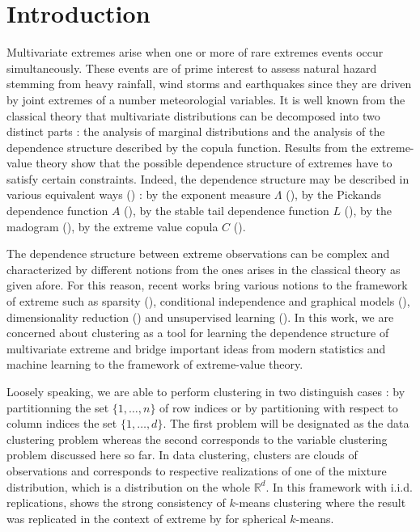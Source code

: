 \documentclass[11pt]{article}
\theoremstyle{definition}
\begin{document}
	\section{Introduction}
	Multivariate extremes arise when one or more of rare extremes events occur simultaneously. These events are of prime interest to assess natural hazard stemming from heavy rainfall, wind storms and earthquakes since they are driven by joint extremes of a number meteorologial variables. It is well known from the classical theory that multivariate distributions can be decomposed into two distinct parts : the analysis of marginal distributions and the analysis of the dependence structure described by the copula function. Results from the extreme-value theory show that the possible dependence structure of extremes have to satisfy certain constraints. Indeed, the dependence structure may be described in various equivalent ways (\cite{beirlant2004statistics,de2006extreme, resnick2008extreme}) : by the exponent measure $\Lambda$ (\cite{balkema1977max}), by the Pickands dependence function $A$ (\cite{pickands1981multivariate}), by the stable tail dependence function $L$ (\cite{huang1992statistics}), by the madogram (\cite{naveau2009modelling}), by the extreme value copula $C$ (\cite{gudendorf2010}).
	
	The dependence structure between extreme observations can be complex and characterized by different notions from the ones arises in the classical theory as given afore. For this reason, recent works bring various notions to the framework of extreme such as sparsity (\cite{goix2015learning,meyer2021sparse, simpson2020determining}), conditional independence and graphical models (\cite{engelke2020graphical, gissibl2018max,segers2020one}), dimensionality reduction (\cite{chautru2015dimension, drees2021principal}) and unsupervised learning (\cite{cooley2019decompositions, janssen2020k}). In this work, we are concerned about clustering as a tool for learning the dependence structure of multivariate extreme and bridge important ideas from modern statistics and machine learning to the framework of extreme-value theory.
	
	Loosely speaking, we are able to perform clustering in two distinguish cases : by partitionning the set $\{1,\dots, n\}$ of row indices or by partitioning with respect to column indices the set $\{1,\dots,d\}$. The first problem will be designated as the data clustering problem whereas the second corresponds to the variable clustering problem discussed here so far. In data clustering, clusters are clouds of observations and corresponds to respective realizations of one of the mixture distribution, which is a distribution on the whole $\mathbb{R}^d$. In this framework with i.i.d. replications, \cite{pollard1981strong} shows the strong consistency of $k$-means clustering where the result was replicated in the context of extreme by \cite{janssen2020k} for spherical $k$-means.
	
\end{document}
